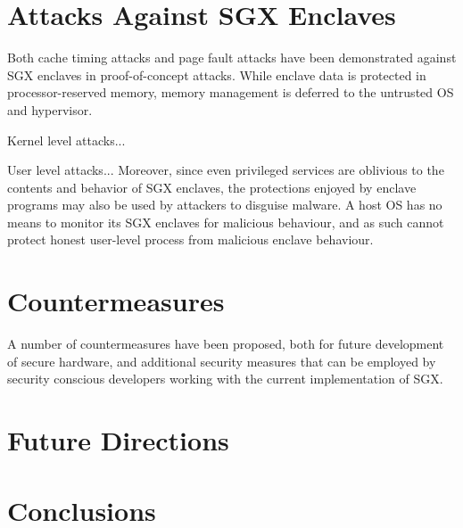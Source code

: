 \section{Attacks Against SGX Enclaves}

Both cache timing attacks and page fault attacks have been demonstrated against SGX enclaves in proof-of-concept attacks. While enclave data is protected in processor-reserved memory, memory management is deferred to the untrusted OS and hypervisor. 

Kernel level attacks...

User level attacks... Moreover, since even privileged services are oblivious to the contents and behavior of SGX enclaves, the protections enjoyed by enclave programs may also be used by attackers to disguise malware. A host OS has no means to monitor its SGX enclaves for malicious behaviour, and as such cannot protect honest user-level process from malicious enclave behaviour. 

\section{Countermeasures}

A number of countermeasures have been proposed, both for future development of secure hardware, and additional security measures that can be employed by security conscious developers working with the current implementation of SGX.

\section{Future Directions}

\section{Conclusions}

